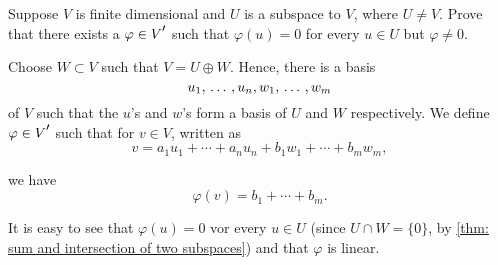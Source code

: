 \begin{xrcs}
  Suppose $V$ is finite dimensional and $U$ is a subspace to $V$, where $U \neq V$. Prove that there exists a $\varphi \in \dual{V}$ such that $\varphi (u) = 0$ for every $u \in U$ but $\varphi \neq 0$.
  \begin{xsol}
    Choose $W \subset V$ such that $V = U \oplus W$. Hence, there is a basis
    \begin{equation}
      u_1, {\, \ldots \,\,}, u_n, w_1, {\, \ldots \,\,}, w_m
    \end{equation}
    of $V$ such that the $u$'s and $w$'s form a basis of $U$ and $W$ respectively. We define $\varphi \in \dual{V}$ such that for $v \in V$, written as
    \begin{equation}
      v = a_1 u_1 + \cdots + a_n u_n + b_1 w_1 + \cdots + b_m w_m,
    \end{equation}

    we have
    \begin{equation}
      \varphi (v) = b_1 + \cdots + b_m.
    \end{equation}

    It is easy to see that $\varphi (u) = 0$ vor every $u \in U$ (since $U \cap W = \{0\}$, by \ref{thm: sum and intersection of two subspaces}) and that $\varphi$ is linear.
  \end{xsol}
\end{xrcs}

